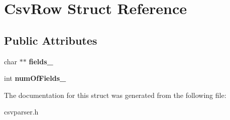 \hypertarget{structCsvRow}{}\section{Csv\+Row Struct Reference}
\label{structCsvRow}
\subsection*{Public Attributes}
\begin{DoxyCompactItemize}
\item 
\mbox{\label{structCsvRow_ab59e5601a0ed7ba9b314a2f72088d20b}} 
char $\ast$$\ast$ {\bfseries fields\+\_\+}
\item 
\mbox{\label{structCsvRow_aad64d8312598aa6b1cea306d7b48dfd3}} 
int {\bfseries num\+Of\+Fields\+\_\+}
\end{DoxyCompactItemize}


The documentation for this struct was generated from the following file\+:\begin{DoxyCompactItemize}
\item 
csvparser.\+h\end{DoxyCompactItemize}
